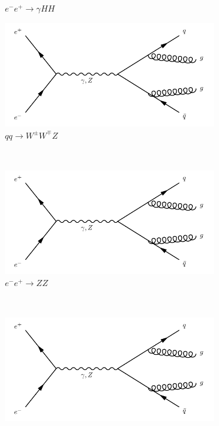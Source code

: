 \begin{figure}[h]
\begin{subfigure}[b]{0.3\textwidth}
    \caption{$e^-e^+ \rightarrow \gamma HH$}
    \label{fey:9}
  \end{subfigure}
  \newline
  \newline
  \begin{subfigure}[b]{0.3\textwidth}
    \includegraphics[width=\textwidth]{../Diagrams/D1.pdf}
    \caption{$qq\rightarrow W^{\pm}W^{\mp}Z$}
    \label{fey:10}
  \end{subfigure}%
  ~
  \begin{subfigure}[b]{0.3\textwidth}
    \includegraphics[width=\textwidth]{../Diagrams/D1.pdf}
    \caption{$e^-e^+\rightarrow ZZ$}
    \label{fey:11}
  \end{subfigure}%
  ~
  \begin{subfigure}[b]{0.3\textwidth}
    \includegraphics[width=\textwidth]{../Diagrams/D1.pdf}

\end{subfigure}
\end{figure}
